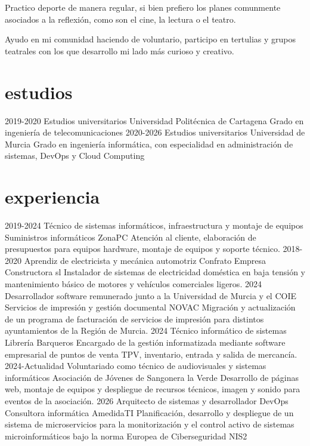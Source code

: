 \documentclass[]{twentysecondcv}
\begin{document}
  Practico deporte de manera regular, si bien prefiero los planes comunmente asociados a la reflexión, como son el cine, la lectura o el teatro.
  
  Ayudo en mi comunidad haciendo de voluntario, participo en tertulias y grupos teatrales con los que desarrollo mi lado más curioso y creativo.

\section{estudios}
\begin{twenty}
  \twentyitem
    {2019-2020}
    {Estudios universitarios}
    {Universidad Politécnica de Cartagena}
    {Grado en ingeniería de telecomunicaciones}
  \twentyitem
    {2020-2026}
    {Estudios universitarios}
    {Universidad de Murcia}
    {Grado en ingeniería informática, con especialidad en administración de sistemas, DevOps y Cloud Computing}
\end{twenty}

\section{experiencia}
\begin{twenty}
  \twentyitem
    {2019-2024}
    {Técnico de sistemas informáticos, infraestructura y montaje de equipos}
    {Suministros informáticos ZonaPC}
    {Atención al cliente, elaboración de presupuestos para equipos hardware, montaje de equipos y soporte técnico.}
  \twentyitem
    {2018-2020}
    {Aprendiz de electricista y mecánica automotriz}
    {Confrato Empresa Constructora sl}
    {Instalador de sistemas de electricidad doméstica en baja tensión y mantenimiento básico de motores y vehículos comerciales ligeros.}
  \twentyitem
    {2024}
    {Desarrollador software remunerado junto a la Universidad de Murcia y el COIE}
    {Servicios de impresión y gestión documental NOVAC}
    {Migración y actualización de un programa de facturación de servicios de impresión para distintos ayuntamientos de la Región de Murcia.}
  \twentyitem
    {2024}
    {Técnico informático de sistemas}
    {Librería Barqueros}
    {Encargado de la gestión informatizada mediante software empresarial de puntos de venta TPV, inventario, entrada y salida de mercancía.}
  \twentyitem
    {2024-Actualidad}
    {Voluntariado como técnico de audiovisuales y sistemas informáticos}
    {Asociación de Jóvenes de Sangonera la Verde}
    {Desarrollo de páginas web, montaje de equipos y despliegue de recursos técnicos, imagen y sonido para eventos de la asociación.}
  \twentyitem
    {2026}
    {Arquitecto de sistemas y desarrollador DevOps}
    {Consultora informática AmedidaTI}
    {Planificación, desarrollo y despliegue de un sistema de microservicios para la monitorización y el control activo de sistemas microinformáticos bajo la norma Europea de Ciberseguridad NIS2}
\end{twenty}
\end{document}
